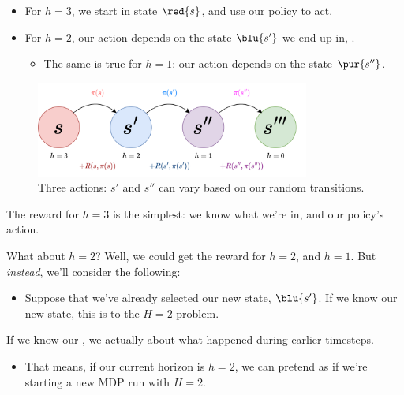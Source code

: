         \begin{itemize}
            \item For $h=3$, we start in state $\red{s}$, and use our policy to act.
            \item For $h=2$, our action depends on the state $\blu{s'}$ we end up in, .
                \begin{itemize}
                    \item The same is true for $h=1$: our action depends on the state $\pur{s''}$.
                \end{itemize}
            
        \end{itemize}

        \begin{figure}[H]
            \centering
            \includegraphics[width=90mm,scale=0.5]{images/mdp_images/horizon_3.png}
            
            \caption*{Three actions: $s'$ and $s''$ can vary based on our random transitions.}
        \end{figure}

        The reward for $h=3$ is the simplest: we know what  we're in, and our policy's action. 

        What about $h=2$? Well, we could  get the reward for $h=2$, and $h=1$. But \textit{instead}, we'll consider the following:

        \begin{itemize}
            \item Suppose that we've already selected our new state, $\blu{s'}$. If we know our new state, this is  to the $H=2$ problem.\\
        \end{itemize}

        \begin{concept}
            If we know our , we actually  about what happened during earlier timesteps.

            \begin{itemize}
                \item That means, if our current horizon is $h=2$, we can pretend as if we're starting a new MDP run with $H=2$.
            \end{itemize}
        \end{concept}

